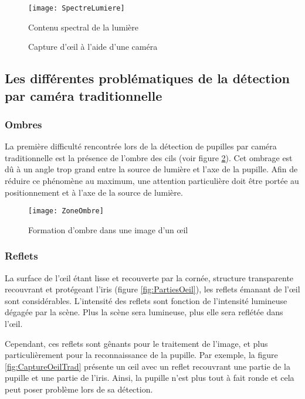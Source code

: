 \begin{figure}[h]
  \centering
  \texttt{[image: SpectreLumiere]}
  \caption{Contenu spectral de la lumière}
  \label{fig:SpectreLumiere}
\end{figure}

\begin{figure}[!h] 
\centering
{}
\quad 
{}
\caption{Capture d’œil à l’aide d’une caméra} 
\end{figure}

\subsection{Les différentes problématiques de la détection par caméra traditionnelle}

\subsubsection{Ombres}

La première difficulté rencontrée lors de la détection de pupilles par caméra traditionnelle est la présence de l'ombre des cils (voir figure \ref{fig:ZoneOmbre}). Cet ombrage est dû à un angle trop grand entre la source de lumière et l’axe de la pupille. Afin de réduire ce phénomène au maximum, une attention particulière doit être portée au positionnement et à l’axe de la source de lumière.

\begin{figure}[h]
  \centering
  \texttt{[image: ZoneOmbre]}
  \caption{Formation d’ombre dans une image d’un œil}
  \label{fig:ZoneOmbre}
\end{figure}

\subsubsection{Reflets}

La surface de l’œil étant lisse et recouverte par la cornée, structure transparente recouvrant et protégeant l’iris (figure \ref{fig:PartiesOeil}), les reflets émanant de l’œil sont considérables. 
L’intensité des reflets sont fonction de l’intensité lumineuse dégagée par la scène. Plus la scène sera lumineuse, plus elle sera reflétée dans l’œil.

Cependant, ces reflets sont gênants pour le traitement de l’image, et plus particulièrement pour la reconnaissance de la pupille. Par exemple, la figure \ref{fig:CaptureOeilTrad} présente un œil avec un reflet recouvrant une partie de la pupille et une partie de l’iris. Ainsi, la pupille n’est plus tout à fait ronde et cela peut poser problème lors de sa détection. 

